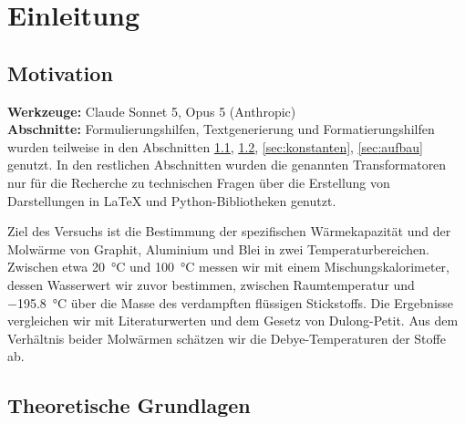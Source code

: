 \documentclass{article}
\let\OrigRef\ref
\renewcommand{\ref}[1]{{\color{linkblue}\uline{\OrigRef{#1}}}}
\begin{document}

\pagestyle{fancy}

\tableofcontents
\clearpage

\section{Einleitung}

\subsection{Motivation}
\label{sec:motivation}

\vspace{1em}
\begin{tcolorbox}[
	colback  = linkblue!3,
	colframe = linkblue!55,
	boxrule  = 0.4pt,
	arc      = 2pt,
	left     = 6pt, right = 6pt, top = 5pt, bottom = 5pt,
	fontupper = \small,
	title    = {\scriptsize\textsf{\textbf{Nutzung von Generativer künstlicher Intelligenz}}},
	coltitle = linkblue!80!black,
	colbacktitle = linkblue!10,
	fonttitle = \normalfont,
]
	\textbf{Werkzeuge:} Claude Sonnet 5, Opus 5 (Anthropic) \\
	\textbf{Abschnitte:} Formulierungshilfen, Textgenerierung und Formatierungshilfen wurden teilweise in 
	den Abschnitten \ref{sec:motivation}, \ref{sec:grundlagen}, \ref{sec:konstanten}, \ref{sec:aufbau} genutzt.
	In den restlichen Abschnitten wurden die genannten Transformatoren nur für die Recherche zu technischen
	Fragen über die Erstellung von Darstellungen in \LaTeX{} und Python-Bibliotheken genutzt.
\end{tcolorbox}

Ziel des Versuchs ist die Bestimmung der spezifischen Wärmekapazität und der Molwärme von Graphit,
Aluminium und Blei in zwei Temperaturbereichen. Zwischen etwa \qty{20}{\degreeCelsius} und
\qty{100}{\degreeCelsius} messen wir mit einem Mischungskalorimeter, dessen Wasserwert wir zuvor
bestimmen, zwischen Raumtemperatur und \qty{-195.8}{\degreeCelsius} über die Masse des verdampften
flüssigen Stickstoffs. Die Ergebnisse vergleichen wir mit Literaturwerten und dem Gesetz von
Dulong-Petit. Aus dem Verhältnis beider Molwärmen schätzen wir die Debye-Temperaturen der Stoffe ab.


\subsection{Theoretische Grundlagen}
\label{sec:grundlagen}
\end{document}
